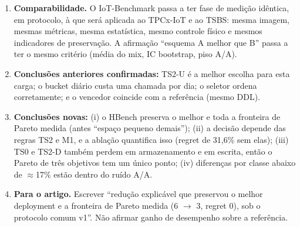\begin{enumerate}
\item \textbf{Comparabilidade.} O IoT-Benchmark passa a ter fase de medição idêntica, em protocolo, à que será aplicada ao TPCx-IoT e ao TSBS: mesma imagem, mesmas métricas, mesma estatística, mesmo controle físico e mesmos indicadores de preservação. A afirmação ``esquema A melhor que B'' passa a ter o mesmo critério (média do mix, IC bootstrap, piso A/A).
\item \textbf{Conclusões anteriores confirmadas:} TS2-U é a melhor escolha para esta carga; o bucket diário custa uma chamada por dia; o seletor ordena corretamente; e o vencedor coincide com a referência (mesmo DDL).
\item \textbf{Conclusões novas:} (i) o HBench preserva o melhor e toda a fronteira de Pareto medida (antes ``espaço pequeno demais''); (ii) a decisão depende das regras TS2 e M1, e a ablação quantifica isso (regret de 31,6\% sem elas); (iii) TS0 e TS2-D também perdem em armazenamento e em escrita, então o Pareto de três objetivos tem um único ponto; (iv) diferenças por classe abaixo de $\approx$17\% estão dentro do ruído A/A.
\item \textbf{Para o artigo.} Escrever ``redução explicável que preservou o melhor deployment e a fronteira de Pareto medida (6 $\rightarrow$ 3, regret 0), sob o protocolo comum v1''. Não afirmar ganho de desempenho sobre a referência.
\end{enumerate}
